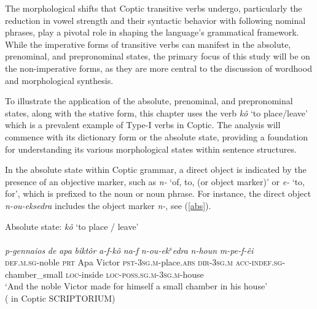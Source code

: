 \documentclass[output=paper,colorlinks,citecolor=brown ,chinesefont]{langscibook}
\begin{document}
The morphological shifts that Coptic transitive verbs undergo, particularly the reduction in vowel strength and their syntactic behavior with following nominal phrases, play a pivotal role in shaping the language's grammatical framework. While the imperative forms of transitive verbs can manifest in the absolute, prenominal, and prepronominal states, the primary focus of this study will be on the non-imperative forms, as they are more central to the discussion of wordhood and morphological synthesis.

To illustrate the application of the absolute, prenominal, and prepronominal states, along with the stative form, this chapter uses the verb  \textit{kô} ‘to place/leave' which is a prevalent example of Type-I verbs in Coptic. The analysis will commence with its dictionary form or the absolute state, providing a foundation for understanding its various morphological states within sentence structures.


In the absolute state within Coptic grammar, a direct object is indicated by the presence of an objective marker, such as  \textit{n-} ‘of, to, (or object marker)' or  \textit{e-} ‘to, for', which is prefixed to the noun or noun phrase. For instance, the direct object  \textit{n-ou-eksedra} includes the object marker  \textit{n-}, see (\ref{abs}). 

\largerpage
\ea\label{abs} Absolute state:  \textit{kô} ‘to place / leave'\\
    \glll {}															 \\
    \textit{p-gennaios} 		\textit{de} 	\textit{apa} 	\textit{biktôr} 		\textit{a-f-kô} 			\textit{na-f} \textit{n-ou-ek$^s$edra} 			\textit{n-houn} 		\textit{m-pe-f-êi}  \\
    \textsc{def}.\textsc{m}.\textsc{sg}-noble	 	\textsc{prt} 	Apa 	Victor 		\textsc{pst}-3\textsc{sg}.\textsc{m}-place.\textsc{abs} 	\textsc{dir}-3\textsc{sg}.\textsc{m} \textsc{acc}-\textsc{indef}.\textsc{sg}-chamber{\_}small 	\textsc{loc}-inside 	\textsc{loc}-\textsc{poss}.\textsc{sg}.\textsc{m}-3\textsc{sg}.\textsc{m}-house \\
    \glt ‘And the noble Victor made for himself a small chamber in his house' \\
    \hspace*{\fill}( in Coptic SCRIPTORIUM)
\z
\end{document}
